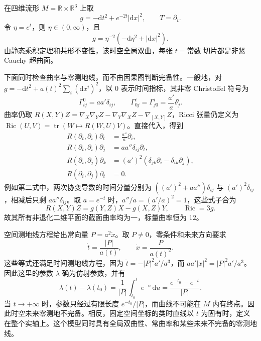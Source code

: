 \begin{example}\label{g3:exm:A-contracting-flat-slicing}
	在四维流形 \(M=\mathbb R\times\mathbb R^3\) 上取
	\begin{equation}\label{g3:eq:A-contracting-metric}
		g=-\mathrm dt^2+e^{-2t}|\mathrm dx|^2,
		\qquad T=\partial_t.
	\end{equation}
	令 \(\eta=e^t\)，则 \(\eta\in(0,\infty)\)，且
	\[
		g=\eta^{-2}(-\mathrm d\eta^2+|\mathrm dx|^2).
	\]
	由静态乘积定理和共形不变性，该时空全局双曲，每张 \(t=\text{常数}\) 切片都是非紧 Cauchy 超曲面。

	下面同时检查曲率与零测地线，而不由因果图判断完备性。一般地，对 \(g=-\mathrm dt^2+a(t)^2\sum_i(\mathrm dx^i)^2\)，以 \(0\) 表示时间指标，其非零 Christoffel 符号为
	\begin{equation}\label{g3:eq:A-flat-warped-connection}
		\Gamma^0_{ij}=aa'\delta_{ij},
		\qquad \Gamma^i_{0j}=\Gamma^i_{j0}=\frac{a'}a\delta^i_j.
	\end{equation}
	曲率仍取 \(R(X,Y)Z=\nabla_X\nabla_YZ-\nabla_Y\nabla_XZ-\nabla_{[X,Y]}Z\)，Ricci 张量仍定义为 \(\operatorname{Ric}(U,V)=\operatorname{tr}(W\mapsto R(W,U)V)\)。直接代入，得到
	\begin{equation}\label{g3:eq:A-flat-warped-curvature}
	\begin{aligned}
		R(\partial_t,\partial_i)\partial_t
		 &=\frac{a''}a\partial_i,\\
		R(\partial_t,\partial_i)\partial_j
		 &=aa''\delta_{ij}\partial_t,\\
		R(\partial_i,\partial_j)\partial_k
		 &=(a')^2(\delta_{jk}\partial_i-\delta_{ik}\partial_j),\\
		R(\partial_i,\partial_j)\partial_t&=0.
	\end{aligned}
	\end{equation}
	例如第二式中，两次协变导数的时间分量分别为 \(((a')^2+aa'')\delta_{ij}\) 与 \((a')^2\delta_{ij}\)，相减后只剩 \(aa''\delta_{ij}\)。取 \(a=e^{-t}\) 时，\(a''/a=(a'/a)^2=1\)，这些式子合为
	\begin{equation}\label{g3:eq:A-contracting-constant-curvature}
		R(X,Y)Z=g(Y,Z)X-g(X,Z)Y,
		\qquad \operatorname{Ric}=3g.
	\end{equation}
	故其所有非退化二维平面的截面曲率均为一，标量曲率恒为 \(12\)。

	空间测地线方程给出常向量 \(P=a^2\dot x\)。取 \(P\ne0\)，零条件和未来方向要求
	\[
		\dot t=\frac{|P|}{a(t)},
		\qquad \dot x=\frac{P}{a(t)^2}.
	\]
	这些等式还满足时间测地线方程，因为
	\(\ddot t=-|P|^2a'/a^3\)，而
	\(aa'|\dot x|^2=|P|^2a'/a^3\)。因此这里的参数 \(\lambda\) 确为仿射参数，并有
	\begin{equation}\label{g3:eq:A-contracting-null-affine}
		\lambda(t)-\lambda(t_0)
		=\frac1{|P|}\int_{t_0}^t e^{-u}\,\mathrm du
		=\frac{e^{-t_0}-e^{-t}}{|P|}.
	\end{equation}
	当 \(t\to+\infty\) 时，参数只经过有限长度 \(e^{-t_0}/|P|\)，而曲线不可能在 \(M\) 内有终点。因此时空未来零测地不完备。相反，固定空间坐标的类时直线以 \(t\) 为固有时，定义在整个实轴上。这个模型同时具有全局双曲性、常曲率和某些未来不完备的零测地线。
\end{example}

